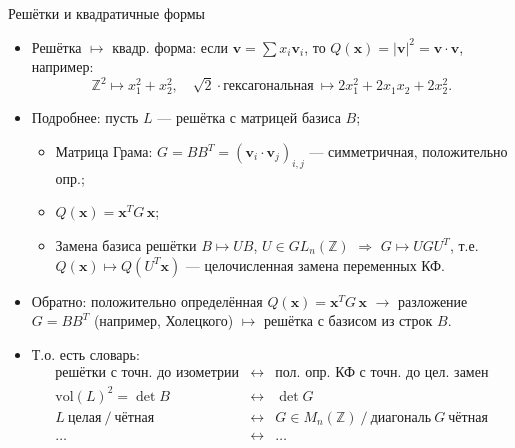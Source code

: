 \documentclass[serif, aspectratio=169]{beamer}
\begin{document}
\begin{frame}{Решётки и квадратичные формы}
    \begin{itemize}
        \item Решётка $\mapsto$ квадр. форма: если $\mathbf{v}=\sum x_i \mathbf{v}_i$, то $Q(\mathbf{x})=|\mathbf{v}|^2 = \mathbf{v}\cdot\mathbf{v}$, например:
        \[\mathbb{Z}^2 \mapsto x_1^2+x_2^2,\quad \sqrt2\cdot\text{гексагональная}\ \mapsto 2x_1^2+2x_1x_2+2x_2^2.\]
        \item Подробнее: пусть $L$ --- решётка с матрицей базиса $B$;
        \begin{itemize}[<.->]
            \item Матрица Грама: $G=BB^{T}=(\mathbf{v}_i\cdot\mathbf{v}_j)_{i,j}$ --- симметричная, положительно опр.;
            \item $Q(\mathbf{x})=\mathbf{x}^{T}G\,\mathbf{x}$;
            \item Замена базиса решётки $B\mapsto UB$, $U\in GL_n(\mathbb{Z})$ $\Rightarrow$ $G\mapsto UGU^{T}$, т.е. $Q(\mathbf{x})\mapsto Q(U^{T}\mathbf{x})$ --- целочисленная замена переменных КФ.
        \end{itemize}
        \item Обратно: положительно определённая $Q(\mathbf{x})=\mathbf{x}^{T}G\,\mathbf{x}$ $\rightarrow$ разложение $G=BB^{T}$ (например, Холецкого) $\mapsto$ решётка с базисом из строк $B$.
        \item Т.о. есть словарь:
        \[
        \begin{array}{rcl}
        \text{решётки с точн. до изометрии} & \leftrightarrow & \text{пол. опр. КФ с точн. до цел. замен}\\
        \mathrm{vol}(L)^2=\det B & \leftrightarrow & \det G\\
        L\ \text{целая}\ /\ \text{чётная} & \leftrightarrow & G\in M_n(\mathbb{Z})\ /\ \text{диагональ}\ G\ \text{чётная}\\
        \dots & \leftrightarrow & \dots
        \end{array}
        \]
    \end{itemize}
\end{frame}
\end{document}
